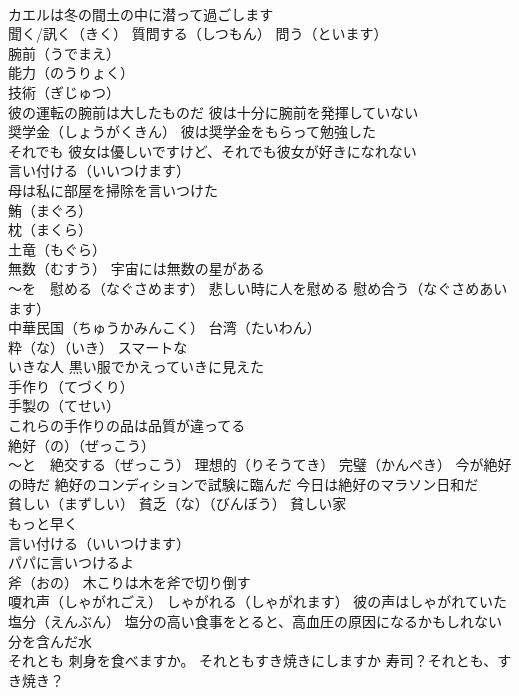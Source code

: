 \documentclass[8pt]{extreport}
\begin{document}
\begin{CJK}{UTF8}{min}
\\	カエルは冬の間土の中に潜って過ごします
\\	聞く/訊く（きく） 質問する（しつもん） 問う（といます） 
\\	腕前（うでまえ）
\\	能力（のうりょく） 
\\	技術（ぎじゅつ） 
\\	彼の運転の腕前は大したものだ 彼は十分に腕前を発揮していない
\\	奨学金（しょうがくきん） 彼は奨学金をもらって勉強した
\\	それでも 彼女は優しいですけど、それでも彼女が好きになれない
\\	言い付ける（いいつけます） 
\\	母は私に部屋を掃除を言いつけた
\\	鮪（まぐろ） 
\\	枕（まくら） 
\\	土竜（もぐら）
\\	無数（むすう） 宇宙には無数の星がある
\\	～を　慰める（なぐさめます） 悲しい時に人を慰める 慰め合う（なぐさめあいます）
\\	中華民国（ちゅうかみんこく） 台湾（たいわん）
\\	粋（な）（いき） スマートな 
\\	いきな人 黒い服でかえっていきに見えた
\\	手作り（てづくり） 
\\	手製の（てせい）
\\	これらの手作りの品は品質が違ってる
\\	絶好（の）（ぜっこう） 
\\	～と　絶交する（ぜっこう） 理想的（りそうてき） 完璧（かんぺき） 今が絶好の時だ 絶好のコンディションで試験に臨んだ 今日は絶好のマラソン日和だ
\\	貧しい（まずしい） 貧乏（な）（びんぼう） 貧しい家
\\	もっと早く
\\	言い付ける（いいつけます） 
\\	パパに言いつけるよ
\\	斧（おの） 木こりは木を斧で切り倒す
\\	嗄れ声（しゃがれごえ） しゃがれる（しゃがれます） 彼の声はしゃがれていた
\\	塩分（えんぶん） 塩分の高い食事をとると、高血圧の原因になるかもしれない 分を含んだ水
\\	それとも 刺身を食べますか。 それともすき焼きにしますか 寿司？それとも、すき焼き？

\end{CJK}
\end{document}
